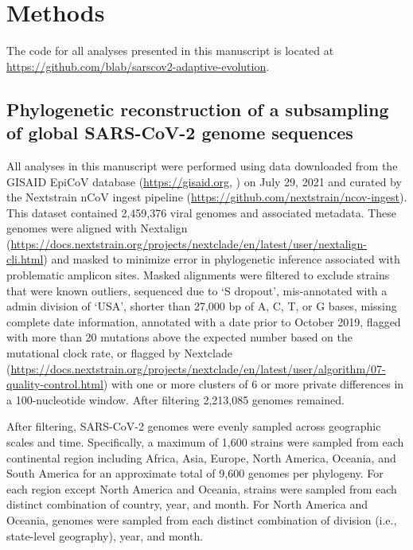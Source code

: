 \documentclass[11pt,oneside,letterpaper]{article}
\begin{document}
\section*{Methods}
\sloppy
The code for all analyses presented in this manuscript is located at \url{https://github.com/blab/sarscov2-adaptive-evolution}.

\subsection*{Phylogenetic reconstruction of a subsampling of global SARS-CoV-2 genome sequences}
All analyses in this manuscript were performed using data downloaded from the GISAID EpiCoV database (\url{https://gisaid.org}, \cite{Shu2017-ql}) on July 29, 2021 and curated by the Nextstrain nCoV ingest pipeline (\url{https://github.com/nextstrain/ncov-ingest}). This dataset contained 2,459,376 viral genomes and associated metadata. These genomes were aligned with Nextalign (\url{https://docs.nextstrain.org/projects/nextclade/en/latest/user/nextalign-cli.html}) and masked to minimize error in phylogenetic inference associated with problematic amplicon sites. Masked alignments were filtered to exclude strains that were known outliers, sequenced due to `S dropout', mis-annotated with a admin division of `USA', shorter than 27,000 bp of A, C, T, or G bases, missing complete date information, annotated with a date prior to October 2019, flagged with more than 20 mutations above the expected number based on the mutational clock rate, or flagged by Nextclade (\url{https://docs.nextstrain.org/projects/nextclade/en/latest/user/algorithm/07-quality-control.html}) with one or more clusters of 6 or more private differences in a 100-nucleotide window. After filtering 2,213,085 genomes remained.

After filtering, SARS-CoV-2 genomes were evenly sampled across geographic scales and time. Specifically, a maximum of 1,600 strains were sampled from each continental region including Africa, Asia, Europe, North America, Oceania, and South America for an approximate total of 9,600 genomes per phylogeny. For each region except North America and Oceania, strains were sampled from each distinct combination of country, year, and month. For North America and Oceania, genomes were sampled from each distinct combination of division (i.e., state-level geography), year, and month.
\end{document}
